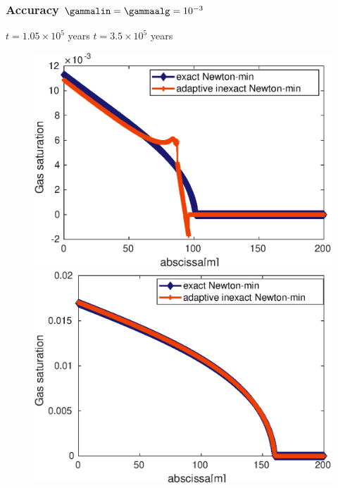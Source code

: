 %
\begin{frame}
\frametitle{Accuracy $\gammalin = \gammaalg = 10^{-3}$}
\vspace{-0.1 cm}
\textcolor{cadmiumgreen}{\hspace{2 cm} $t = 1.05 \times 10^5$ years \hspace{5 cm} $t = 3.5 \times 10^5$ years}
\begin{figure}
\centering
\includegraphics[width=0.48 \textwidth]{fig_article_chap_3/comparaison_plot_gas_saturations_exact_adapt_inexact_gamma_lin_gamma_alg_10-3_nt_21}
\includegraphics[width=0.48 \textwidth]{fig_article_chap_3/comparaison_plot_gas_saturations_exact_adapt_inexact_gamma_lin_gamma_alg_10-3_nt_70}
\end{figure}
\end{frame}
%
